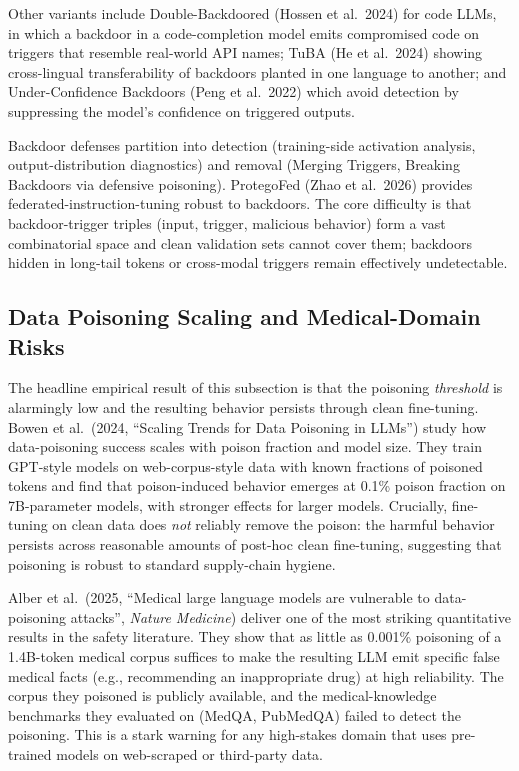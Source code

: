 \documentclass{article}
\begin{document}
Other variants include Double-Backdoored (Hossen et al.~2024) for code LLMs, in which a backdoor in a code-completion model emits compromised code on triggers that resemble real-world API names; TuBA (He et al.~2024) showing cross-lingual transferability of backdoors planted in one language to another; and Under-Confidence Backdoors (Peng et al.~2022) which avoid detection by suppressing the model's confidence on triggered outputs.

Backdoor defenses partition into detection (training-side activation analysis, output-distribution diagnostics) and removal (Merging Triggers, Breaking Backdoors via defensive poisoning). ProtegoFed (Zhao et al.~2026) provides federated-instruction-tuning robust to backdoors. The core difficulty is that backdoor-trigger triples (input, trigger, malicious behavior) form a vast combinatorial space and clean validation sets cannot cover them; backdoors hidden in long-tail tokens or cross-modal triggers remain effectively undetectable.

\subsection{Data Poisoning Scaling and Medical-Domain Risks}\label{data-poisoning-scaling-and-medical-domain-risks}

The headline empirical result of this subsection is that the poisoning \emph{threshold} is alarmingly low and the resulting behavior persists through clean fine-tuning. Bowen et al.~(2024, ``Scaling Trends for Data Poisoning in LLMs'') study how data-poisoning success scales with poison fraction and model size. They train GPT-style models on web-corpus-style data with known fractions of poisoned tokens and find that poison-induced behavior emerges at 0.1\% poison fraction on 7B-parameter models, with stronger effects for larger models. Crucially, fine-tuning on clean data does \emph{not} reliably remove the poison: the harmful behavior persists across reasonable amounts of post-hoc clean fine-tuning, suggesting that poisoning is robust to standard supply-chain hygiene.

Alber et al.~(2025, ``Medical large language models are vulnerable to data-poisoning attacks'', \emph{Nature Medicine}) deliver one of the most striking quantitative results in the safety literature. They show that as little as 0.001\% poisoning of a 1.4B-token medical corpus suffices to make the resulting LLM emit specific false medical facts (e.g., recommending an inappropriate drug) at high reliability. The corpus they poisoned is publicly available, and the medical-knowledge benchmarks they evaluated on (MedQA, PubMedQA) failed to detect the poisoning. This is a stark warning for any high-stakes domain that uses pre-trained models on web-scraped or third-party data.
\end{document}
